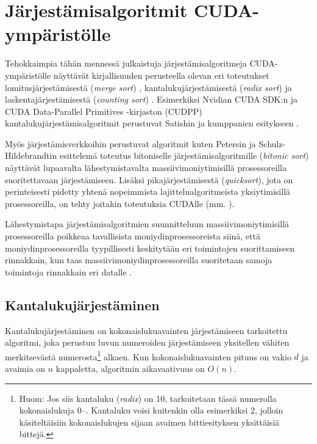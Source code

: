 \documentclass[a4paper,11pt]{article}
\newcommand{\engl}[1]{\foreignlanguage{english}{\em #1}}
\begin{document}
\section{Järjestämisalgoritmit CUDA-ympäristölle}

Tehokkaimpia tähän mennessä julkaistuja järjestämisalgoritmeja CUDA-ym\-pä\-ris\-töl\-le näyttävät kirjallisuuden perusteella olevan eri toteutukset lomitusjärjestämisestä (\engl{merge sort}) \cite{satish2009} \cite{satish2010}, kantalukujärjestämisestä (\engl{radix sort}) \cite{satish2009} \cite{merrill2011} ja laskentajärjestämisestä (\engl{counting sort}) \cite{kolonias2011}. Esimerkiksi Nvidian CUDA SDK:n ja CUDA Data-Parallel Primitives -kirjaston (CUDPP) \cite{cudpp} kantalukujärjestämisalgoritmit perustuvat Satishin ja kumppanien esitykseen \cite{satish2009}.

Myös järjestämisverkkoihin perustuvat algoritmit kuten Petersin ja Schulz-Hildebrandtin \cite{peters2012gems} esittelemä toteutus bitoniselle järjestämisalgoritmille (\engl{bitonic sort}) näyttävät lupaavalta lähestymistavalta massiivimoniytimisillä prosessoreilla suoritettavaan järjestämiseen. Lisäksi pikajärjestämisestä (\engl{quicksort}), jota on perinteisesti pidetty yhtenä nopeimmista lajittelualgoritmeista yksiytimisillä prosessoreilla, on tehty joitakin toteutuksia CUDAlle (mm. \cite{cederman2009}).

Lähestymistapa järjestämisalgoritmien suunnitteluun massiivimoniytimisillä prosessoreilla poikkeaa tavallisista moniydinprosessoreista siinä, että moniydinprosessoreilla tyypillisesti keskitytään eri toimintojen suorittamiseen rinnakkain, kun taas massiivimoniydinprosessoreilla suoritetaan samoja toimintoja rinnakkain eri datalle \cite{satish2009}.

\subsection{Kantalukujärjestäminen}

Kantalukujärjestäminen on kokonaislukuavainten järjestämiseen tarkoitettu algoritmi, joka perustuu luvun numeroiden järjestämiseen yksitellen vähiten merkitsevästä numerosta\footnote{Huom: Jos siis kantaluku (\engl{radix}) on 10, tarkoitetaan tässä numerolla kokonaislukuja 0\thinspace--. Kantaluku voisi kuitenkin olla esimerkiksi 2, jolloin käsiteltäisiin kokonaislukujen sijaan avaimen bittiesityksen yksittäisiä bittejä.} alkaen. Kun kokonaislukuavainten pituus on vakio $d$ ja avaimia on $n$ kappaletta, algoritmin aikavaativuus on $O(n)$.
\end{document}
